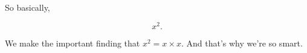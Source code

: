 \documentclass{article}
\begin{document}
  So basically,

  \begin{equation}
    x^2.
  \end{equation}

  We make the important finding that $ x^2 = x \times x. $
  And that's why we're so smart.
\end{document}
